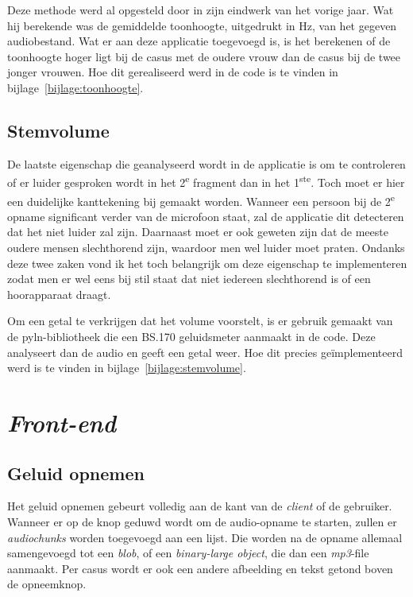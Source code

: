 Deze methode werd al opgesteld door \textcite{Standaert2021} in zijn eindwerk van het vorige jaar. Wat hij berekende was de gemiddelde toonhoogte, uitgedrukt in Hz, van het gegeven audiobestand. Wat er aan deze applicatie toegevoegd is, is het berekenen of de toonhoogte hoger ligt bij de casus met de oudere vrouw dan de casus bij de twee jonger vrouwen.
Hoe dit gerealiseerd werd in de code is te vinden in bijlage~\ref{bijlage:toonhoogte}.

\subsection{Stemvolume}
De laatste eigenschap die geanalyseerd wordt in de applicatie is om te controleren of er luider gesproken wordt in het 2\textsuperscript{e} fragment dan in het 1\textsuperscript{ste}. Toch moet er hier een duidelijke kanttekening bij gemaakt worden. Wanneer een persoon bij de 2\textsuperscript{e} opname significant verder van de microfoon staat, zal de applicatie dit detecteren dat het niet luider zal zijn. Daarnaast moet er ook geweten zijn dat de meeste oudere mensen slechthorend zijn, waardoor men wel luider moet praten. Ondanks deze twee zaken vond ik het toch belangrijk om deze eigenschap te implementeren zodat men er wel eens bij stil staat dat niet iedereen slechthorend is of een hoorapparaat draagt.

Om een getal te verkrijgen dat het volume voorstelt, is er gebruik gemaakt van de pyln-bibliotheek die een BS.170 geluidsmeter aanmaakt in de code. Deze analyseert dan de audio en geeft een getal weer. Hoe dit precies geïmplementeerd werd is te vinden in bijlage~\ref{bijlage:stemvolume}.

\section{\textit{Front-end}}
\subsection{Geluid opnemen}
Het geluid opnemen gebeurt volledig aan de kant van de \textit{client} of de gebruiker. Wanneer er op de knop geduwd wordt om de audio-opname te starten, zullen er \textit{audiochunks } worden toegevoegd aan een lijst. Die worden na de opname allemaal samengevoegd tot een \textit{blob}, of een \textit{binary-large object}, die dan een \textit{mp3}-file aanmaakt.
Per casus wordt er ook een andere afbeelding en tekst getond boven de opneemknop.

